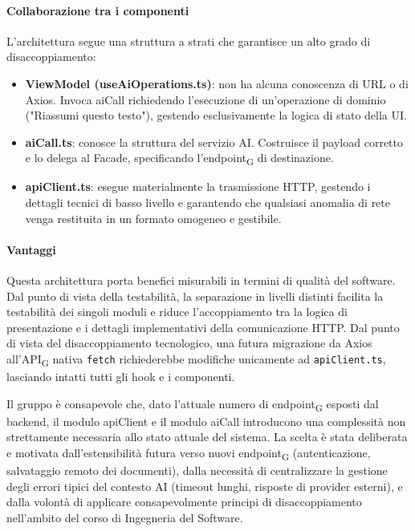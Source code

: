 \documentclass[11pt,a4paper]{article}
\newcommand{\gls}[1]{#1\textsubscript{G}}
\begin{document}
\paragraph{Collaborazione tra i componenti}
L'architettura segue una struttura a strati che garantisce un alto grado di disaccoppiamento:
\begin{itemize}
\item \textbf{ViewModel (useAiOperations.ts)}: non ha alcuna conoscenza di URL o di Axios. Invoca aiCall richiedendo l'esecuzione di un'operazione di dominio ("Riassumi questo testo"), gestendo esclusivamente la logica di stato della UI.
\item \textbf{aiCall.ts}: conosce la struttura del servizio AI. Costruisce il payload corretto e lo delega al Facade, specificando l'\gls{endpoint} di destinazione.
\item \textbf{apiClient.ts}: esegue materialmente la trasmissione HTTP, gestendo i dettagli tecnici di basso livello e garantendo che qualsiasi anomalia di rete venga restituita in un formato omogeneo e gestibile.
\end{itemize}

\paragraph{Vantaggi}
Questa architettura porta benefici misurabili in termini di qualità del software. Dal punto di vista della testabilità, la separazione in livelli distinti facilita la testabilità dei singoli moduli e riduce l'accoppiamento tra la logica di presentazione e i dettagli implementativi della comunicazione HTTP. Dal punto di vista del disaccoppiamento tecnologico, una futura migrazione da Axios all'\gls{API} nativa \texttt{fetch} richiederebbe modifiche unicamente ad \texttt{apiClient.ts}, lasciando intatti tutti gli hook e i componenti.

Il gruppo è consapevole che, dato l'attuale numero di \gls{endpoint} esposti dal backend, il modulo apiClient e il modulo aiCall introducono una complessità non strettamente necessaria allo stato attuale del sistema. La scelta è stata deliberata e motivata dall'estensibilità futura verso nuovi \gls{endpoint} (autenticazione, salvataggio remoto dei documenti), dalla necessità di centralizzare la gestione degli errori tipici del contesto AI (timeout lunghi, risposte di provider esterni), e dalla volontà di applicare consapevolmente principi di disaccoppiamento nell'ambito del corso di Ingegneria del Software.
\end{document}
